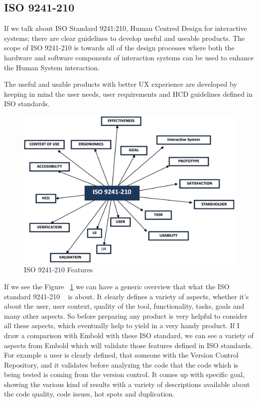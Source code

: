 \subsection{ISO 9241-210}
If we talk about ISO Standard 9241:210, Human Centred Design for interactive systems; there are clear guidelines to develop useful and useable products. The scope of ISO 9241-210 is towards all of the design processes where both the hardware and software components of interaction systems can be used to enhance the Human System interaction.\par
The useful and usable products with better UX experience are developed by keeping in mind the user needs, user requirements and  HCD guidelines defined in ISO standards.
\begin{figure}[htbp]
\begin{center}
\includegraphics[width=4 in, height=3 in]{ISO.png}
\caption{ISO 9241-210 Features}
\label{fig:ISO}
\end{center}
\end{figure}
If we see the Figure ~\ref{fig:ISO} we can have a generic overview that what the ISO standard 9241-210 ~\cite{ISO} is about. It clearly defines a variety of aspects, whether it's about the user, user context, quality of the tool, functionality, tasks, goals and many other aspects. So before preparing any product is very helpful to consider all these aspects, which eventually help to yield in a very handy product. If I draw a comparison with Embold with these ISO standard, we can see a variety of aspects from Embold which will validate those features defined in ISO standards. For example a user is clearly defined, that someone with the Version Control Repository, and it validates before analyzing the code that the code which is being tested is coming from the version control. 
It comes up with specific goal, showing the various kind of results with a variety of descriptions available about the code quality, code issues, hot spots and duplication.  \par
